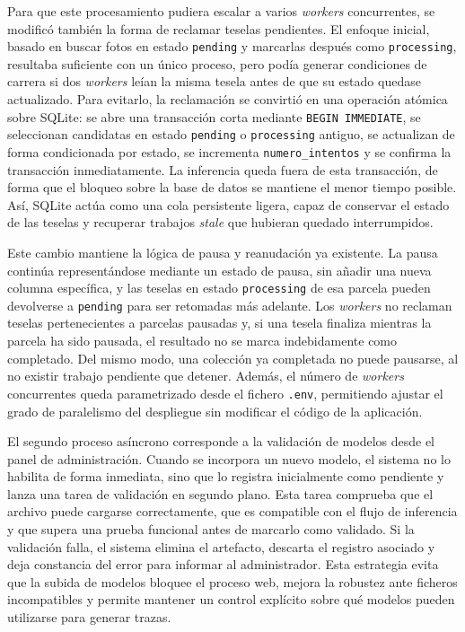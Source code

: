 Para que este procesamiento pudiera escalar a varios \textit{workers} concurrentes, se modificó también la forma de reclamar teselas pendientes. El enfoque inicial, basado en buscar fotos en estado \texttt{pending} y marcarlas después como \texttt{processing}, resultaba suficiente con un único proceso, pero podía generar condiciones de carrera si dos \textit{workers} leían la misma tesela antes de que su estado quedase actualizado. Para evitarlo, la reclamación se convirtió en una operación atómica sobre SQLite: se abre una transacción corta mediante \texttt{BEGIN IMMEDIATE}, se seleccionan candidatas en estado \texttt{pending} o \texttt{processing} antiguo, se actualizan de forma condicionada por estado, se incrementa \texttt{numero\_intentos} y se confirma la transacción inmediatamente. La inferencia queda fuera de esta transacción, de forma que el bloqueo sobre la base de datos se mantiene el menor tiempo posible. Así, SQLite actúa como una cola persistente ligera, capaz de conservar el estado de las teselas y recuperar trabajos \textit{stale} que hubieran quedado interrumpidos.

Este cambio mantiene la lógica de pausa y reanudación ya existente. La pausa continúa representándose mediante un estado de pausa, sin añadir una nueva columna específica, y las teselas en estado \texttt{processing} de esa parcela pueden devolverse a \texttt{pending} para ser retomadas más adelante. Los \textit{workers} no reclaman teselas pertenecientes a parcelas pausadas y, si una tesela finaliza mientras la parcela ha sido pausada, el resultado no se marca indebidamente como completado. Del mismo modo, una colección ya completada no puede pausarse, al no existir trabajo pendiente que detener. Además, el número de \textit{workers} concurrentes queda parametrizado desde el fichero \texttt{.env}, permitiendo ajustar el grado de paralelismo del despliegue sin modificar el código de la aplicación.

El segundo proceso asíncrono corresponde a la validación de modelos desde el panel de administración. Cuando se incorpora un nuevo modelo, el sistema no lo habilita de forma inmediata, sino que lo registra inicialmente como pendiente y lanza una tarea de validación en segundo plano. Esta tarea comprueba que el archivo puede cargarse correctamente, que es compatible con el flujo de inferencia y que supera una prueba funcional antes de marcarlo como validado. Si la validación falla, el sistema elimina el artefacto, descarta el registro asociado y deja constancia del error para informar al administrador. Esta estrategia evita que la subida de modelos bloquee el proceso web, mejora la robustez ante ficheros incompatibles y permite mantener un control explícito sobre qué modelos pueden utilizarse para generar trazas. 

